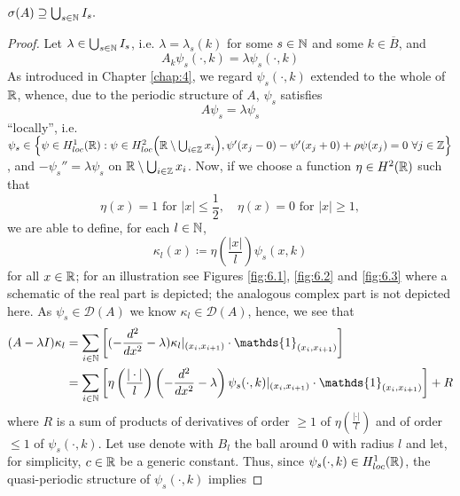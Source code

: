 \begin{theorem} \label{4.1:thm-MainResult.FirstInclusion}
	$\sigma(A) \supseteq \bigcup_{s \in \mathbb{N}} I_{s}.$
	
	\begin{proof}
		Let $\lambda \in \bigcup_{s \in \mathbb{N}} I_{s}$, i.e. $\lambda = \lambda_{s}(k)$ for some $s \in \mathbb{N}$ and some $k \in \overline{B}$, and 
		\begin{equation}
			A_{k} \psi_{s}(\cdot, k) = \lambda \psi_{s}(\cdot, k) \label{firstinclusion-firstequation} 
		\end{equation} 
		As introduced in Chapter \ref{chap:4}, we regard $\psi_{s}(\cdot, k)$ extended to the whole of $\mathbb{R}$, whence, due to the periodic structure of $A$, $\psi_{s}$ satisfies
		\[ A \psi_{s} = \lambda \psi_{s} \]
		\enquote{locally}, i.e. $\psi_{s} \in \Big\{ \psi \in  H^{1}_{loc}(\mathbb{R}) : \psi \in H^{2}_{loc}\Big(\mathbb{R} \setminus \bigcup_{i \in \mathbb{Z}} x_{i} \Big), \psi'(x_{j} - 0) - \psi'(x_{j} + 0) + \rho  \psi(x_{j}) = 0 ~\forall j \in \mathbb{Z} \Big\}$, and $ -\psi_{s}'' = \lambda \psi_{s}$ on $\mathbb{R} \setminus \bigcup_{i \in \mathbb{Z}} x_{i}$. Now, if we choose a function $\eta \in H^{2}(\mathbb{R})$ such that 
			\begin{equation}
				\eta(x) = 1 \text{ for } |x| \leq \frac{1}{2}, \quad \eta(x) = 0 \text{ for } |x| \geq 1, \label{eta}
			\end{equation} 
		we are able to define, for each $l \in \mathbb{N}$,
			\[ \kappa_{l}(x) \coloneqq \eta\left(\frac{|x|}{l}\right) \psi_{s}(x, k) \]		
	 	for all $x \in \mathbb{R}$; for an illustration see Figures \ref{fig:6.1}, \ref{fig:6.2} and \ref{fig:6.3} where a schematic of the real part is depicted; the analogous complex part is not depicted here. As $\psi_{s} \in \mathcal{D}(A)$ we know $\kappa_{l} \in \mathcal{D}(A)$, hence, we see that
		\begin{align}
			(A - \lambda I) \kappa_{l} & = \sum_{i \in \N} \left[ (- \frac{d^{2}}{dx^{2}} - \lambda) \kappa_{l}|_{(x_{i}, x_{i+1})} \cdot \mathds{1}_{(x_{i}, x_{i+1})} \right] \label{eq:sepofspectraleq} \\
				& = \sum_{i \in \N} \left[ \eta\left(\frac{|\cdot|}{l}\right) \left(- \frac{d^{2}}{dx^{2}} - \lambda \right) \psi_{s}(\cdot, k) |_{(x_{i}, x_{i+1})} \cdot \mathds{1}_{(x_{i}, x_{i+1})} \right] + R \notag
		\end{align}
		where $R$ is a sum of products of derivatives of order $\geq 1$ of $\eta\left(\frac{|\cdot|}{l}\right)$ and of order $\leq 1$ of $\psi_{s}(\cdot, k)$. 
		Let use denote with $B_{l}$ the ball around $0$ with radius $l$ and let, for simplicity, $c \in \mathbb{R}$ be a generic constant. Thus, since $\psi_{s}(\cdot, k) \in H^{1}_{loc}(\mathbb{R})$, the quasi-periodic structure of $\psi_{s}(\cdot, k)$ implies

\end{proof}
\end{theorem}
